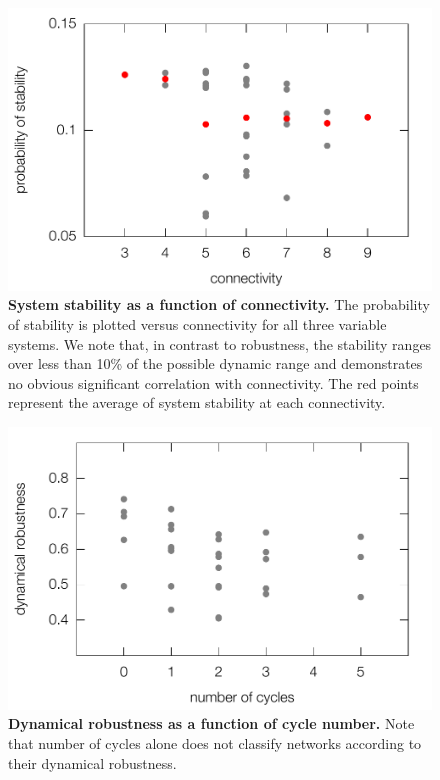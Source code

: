 \pagebreak

\begin{figure}[!ht]
\centering
\noindent\includegraphics[width=0.6\columnwidth]{fig/apstab3x3.pdf}
\caption{{\bf System stability as a function of connectivity.} The probability of stability is plotted versus connectivity for all three variable systems. We note that, in contrast to robustness, the stability ranges over less than 10\% of the possible dynamic range and demonstrates no obvious significant correlation with connectivity. The red points represent the average of system stability at each connectivity.}
\label{fig:apstab3x3}
\end{figure}

\pagebreak
\FloatBarrier

\begin{figure}[!ht]
\centering
\noindent\includegraphics[width=0.6\columnwidth]{fig/cycle3x3.pdf}
\caption{{\bf Dynamical robustness as a function of cycle number.} Note that number of cycles alone does not classify networks according to their dynamical robustness.}
\label{fig:cycle3x3}
\end{figure}


